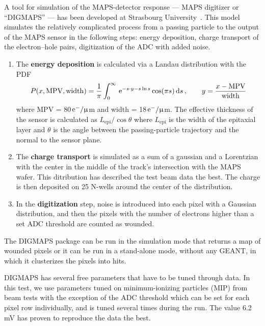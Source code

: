 A tool for simulation of the MAPS-detector response --- MAPS digitizer or ``DIGMAPS'' --- has been developed at Strasbourg University~\cite{DIGMAPS}\@. This model simulates the relatively complicated process from a passing particle to the output of the MAPS sensor in the following steps: energy deposition, charge transport of the electron--hole pairs, digitization of the ADC with added noise.
\begin{enumerate}
 \item The \textbf{energy deposition} is calculated via a Landau distribution with the PDF~\cite{Landau}
 \begin{equation}
  P(x,\mathrm{MPV},\mathrm{width}) = \frac{1}{\pi}\int^{\infty}_{0}\, \mathrm{e}^{-s\cdot y - s\ln s} \cos(\pi s)\,\mathrm{d} s \,,\qquad y=\frac{x-\mathrm{MPV}}{\mathrm{width}}
 \end{equation}
 where MPV = 80$\,\mathrm{e}^-/\upmu$m and width = 18$\,\mathrm{e}^-/\upmu$m.
The effective thickness of the sensor is calculated as $L_\mathrm{epi}/\cos \theta$ where $L_\mathrm{epi}$ is the width of the epitaxial layer and $\theta$ is the angle between the passing-particle trajectory and the normal to the sensor plane.
 \item The \textbf{charge transport} is simulated as a sum of a gaussian and a Lorentzian with the center in the middle of the track's intersection with the MAPS wafer. This ditribution has described the test beam data the best. The charge is then deposited on 25 N-wells around the center of the distribution.
 \item In the \textbf{digitization} step, noise is introduced into each pixel with a Gaussian distribution, and then the pixels with the number of electrons higher than a set ADC threshold are counted as wounded.
\end{enumerate}

The DIGMAPS package can be run in the simulation mode that returns a map of wounded pixels or it can be run in a stand-alone mode, without any GEANT, in which it clusterizes the pixels into hits.

DIGMAPS has several free parameters that have to be tuned through data. In this test, we use parameters tuned on minimum-ionizing particles (MIP) from beam tests with the exception of the ADC threshold which can be set for each pixel row individually, and is tuned several times during the run. The value 6.2$\,$mV has proven to reproduce the data the best.
 
